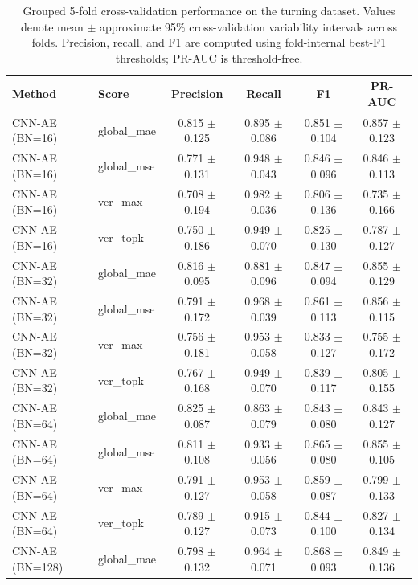 \begin{table}[t]
\centering
\small
\setlength{\tabcolsep}{3.5pt}
\caption{Grouped 5-fold cross-validation performance on the turning dataset. Values denote mean $\pm$ approximate 95\% cross-validation variability intervals across folds. Precision, recall, and F1 are computed using fold-internal best-F1 thresholds; PR-AUC is threshold-free.}
\label{tab:turning_bottleneck_baseline_cv}
\begin{tabular}{@{}llcccc@{}}
\toprule
Method & Score & Precision & Recall & F1 & PR-AUC \\
\midrule
CNN-AE (BN=16) & global\_mae & 0.815 $\pm$ 0.125 & 0.895 $\pm$ 0.086 & 0.851 $\pm$ 0.104 & 0.857 $\pm$ 0.123 \\
CNN-AE (BN=16) & global\_mse & 0.771 $\pm$ 0.131 & 0.948 $\pm$ 0.043 & 0.846 $\pm$ 0.096 & 0.846 $\pm$ 0.113 \\
CNN-AE (BN=16) & ver\_max & 0.708 $\pm$ 0.194 & 0.982 $\pm$ 0.036 & 0.806 $\pm$ 0.136 & 0.735 $\pm$ 0.166 \\
CNN-AE (BN=16) & ver\_topk & 0.750 $\pm$ 0.186 & 0.949 $\pm$ 0.070 & 0.825 $\pm$ 0.130 & 0.787 $\pm$ 0.127 \\
\addlinespace
CNN-AE (BN=32) & global\_mae & 0.816 $\pm$ 0.095 & 0.881 $\pm$ 0.096 & 0.847 $\pm$ 0.094 & 0.855 $\pm$ 0.129 \\
CNN-AE (BN=32) & global\_mse & 0.791 $\pm$ 0.172 & 0.968 $\pm$ 0.039 & 0.861 $\pm$ 0.113 & 0.856 $\pm$ 0.115 \\
CNN-AE (BN=32) & ver\_max & 0.756 $\pm$ 0.181 & 0.953 $\pm$ 0.058 & 0.833 $\pm$ 0.127 & 0.755 $\pm$ 0.172 \\
CNN-AE (BN=32) & ver\_topk & 0.767 $\pm$ 0.168 & 0.949 $\pm$ 0.070 & 0.839 $\pm$ 0.117 & 0.805 $\pm$ 0.155 \\
\addlinespace
CNN-AE (BN=64) & global\_mae & 0.825 $\pm$ 0.087 & 0.863 $\pm$ 0.079 & 0.843 $\pm$ 0.080 & 0.843 $\pm$ 0.127 \\
CNN-AE (BN=64) & global\_mse & 0.811 $\pm$ 0.108 & 0.933 $\pm$ 0.056 & 0.865 $\pm$ 0.080 & 0.855 $\pm$ 0.105 \\
CNN-AE (BN=64) & ver\_max & 0.791 $\pm$ 0.127 & 0.953 $\pm$ 0.058 & 0.859 $\pm$ 0.087 & 0.799 $\pm$ 0.133 \\
CNN-AE (BN=64) & ver\_topk & 0.789 $\pm$ 0.127 & 0.915 $\pm$ 0.073 & 0.844 $\pm$ 0.100 & 0.827 $\pm$ 0.134 \\
\addlinespace
CNN-AE (BN=128) & global\_mae & 0.798 $\pm$ 0.132 & 0.964 $\pm$ 0.071 & 0.868 $\pm$ 0.093 & 0.849 $\pm$ 0.136 \\

\end{tabular}
\end{table}
